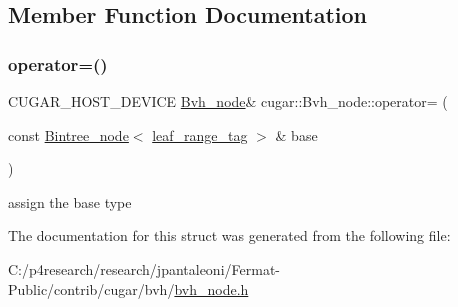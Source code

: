 \subsection{Member Function Documentation}
\mbox{\label{structcugar_1_1_bvh__node_ad368801b53b70ab0c54a810971a16968}} 
\subsubsection{\texorpdfstring{operator=()}{operator=()}}
{\footnotesize\ttfamily C\+U\+G\+A\+R\+\_\+\+H\+O\+S\+T\+\_\+\+D\+E\+V\+I\+CE \hyperlink{structcugar_1_1_bvh__node}{Bvh\+\_\+node}\& cugar\+::\+Bvh\+\_\+node\+::operator= (\begin{DoxyParamCaption}\item[{const \hyperlink{structcugar_1_1_bintree__node}{Bintree\+\_\+node}$<$ \hyperlink{structcugar_1_1leaf__range__tag}{leaf\+\_\+range\+\_\+tag} $>$ \&}]{base }\end{DoxyParamCaption})\hspace{0.3cm}{\ttfamily [inline]}}

assign the base type 

The documentation for this struct was generated from the following file\+:\begin{DoxyCompactItemize}
\item 
C\+:/p4research/research/jpantaleoni/\+Fermat-\/\+Public/contrib/cugar/bvh/\hyperlink{bvh__node_8h}{bvh\+\_\+node.\+h}\end{DoxyCompactItemize}
